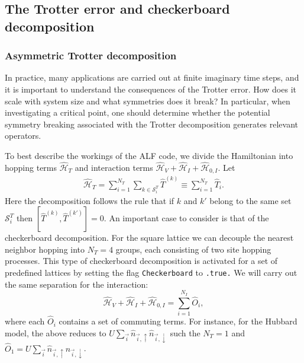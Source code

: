 %



\subsection{The Trotter error and  checkerboard  decomposition }\label{sec:trotter}
%

\subsubsection{ Asymmetric  Trotter decomposition }
In practice, many applications are carried out at finite  imaginary time steps,  and it is important to  understand the consequences of the Trotter error.
How does it scale with system size and  what  symmetries  does it break?
In particular, when investigating a critical point, one should determine whether the potential symmetry breaking  associated  with the Trotter decomposition generates relevant operators.

To best describe the workings of the ALF  code,  we divide the Hamiltonian into  hopping terms  $\hat{\mathcal{H}}_{T}$  and interaction terms  
$\hat{\mathcal{H}}_{V} +  \hat{\mathcal{H}}_{I}   +   \hat{\mathcal{H}}_{0,I} $.       Let 
\begin{align}
\label{Checkerboard.Eq}
	\hat{\mathcal{H}}_{T}     = \sum_{i=1}^{N_T} \sum_{k \in \mathcal{S}^{T}_i} \hat{T}^{(k)}  \equiv \sum_{i=1}^{N_T} \hat{T}_{i}.
\end{align}
Here the decomposition follows the rule  that if $k$ and $k'$  belong to the same set $\mathcal{S}^{T}_i $ then   $ \left[ \hat{T}^{(k)} , \hat{T}^{(k')} \right] = 0 $.  An important case to consider is that of the checkerboard decomposition.
For the square lattice we can decouple the nearest neighbor hopping  into $N_T=4$ groups,  each consisting of two site hopping processes.
This type of checkerboard decomposition is activated for a set  of predefined lattices by setting the flag  \texttt{Checkerboard} to \texttt{.true.}
We will carry out the same separation for the interaction: 
\begin{equation}
	\hat{\mathcal{H}}_{V}  +  \hat{\mathcal{H}}_{I}   +   \hat{\mathcal{H}}_{0,I}   = \sum_{i=1}^{N_I}  \hat{O}_{i},
\end{equation}
where each $\hat{O}_{i}$  contains a set of commuting terms.  For instance, for the Hubbard model,   the  above reduces to 
$U \sum_{\vec{i}}  \hat{n}_{\vec{i},\uparrow } \hat{n}_{\vec{i},\downarrow }  $    such the $N_T = 1$ and   $ \hat{O}_{1} = U \sum_{\vec{i}}  \hat{n}_{\vec{i},\uparrow } \hat{n}_{\vec{i},\downarrow }   $. 


